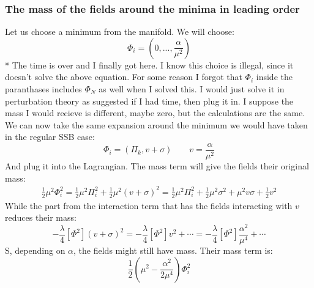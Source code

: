 \documentclass{article}
\begin{document}
\subsubsection{The mass of the fields around the minima in leading order}
Let us choose a minimum from the manifold. We will choose:
\begin{equation}
    \Phi_i = \left(0, ..., \frac{\alpha}{\mu^2}\right)
\end{equation}
* The time is over and I finally got here. I know this choice is illegal, since it doesn't solve the above equation. For some reason I forgot that $\Phi_i$ inside the paranthases includes $\Phi_N$ as well when I solved this. I would just solve it in perturbation theory as suggested if I had time, then plug it in. I suppose the mass I would recieve is different, maybe zero, but the calculations are the same.
\newline
We can now take the same expansion around the minimum we would have taken in the regular SSB case:
\begin{equation}
    \Phi_i = (\Pi_k, v + \sigma)
    \qquad
    v = \frac{\alpha}{\mu^2}
\end{equation}
And plug it into the Lagrangian. The mass term will give the fields their original mass:
\begin{equation}
\begin{gathered}
    \frac{1}{2}\mu^2\Phi_i^2 = \frac{1}{2}\mu^2\Pi_i^2 + \frac{1}{2}\mu^2\left(v + \sigma\right)^2 =
    \frac{1}{2}\mu^2\Pi_i^2 + \frac{1}{2}\mu^2\sigma^2 + \mu^2v\sigma + \frac{1}{2}v^2
\end{gathered}
\end{equation}
While the part from the interaction term that has the fields interacting with $v$ reduces their mass:
\begin{equation}
    -\frac{\lambda}{4} \left[\Phi^2\right](v + \sigma)^2 = 
    -\frac{\lambda}{4} \left[\Phi^2\right]v^2 + \cdots = 
    -\frac{\lambda}{4} \left[\Phi^2\right]\frac{\alpha^2}{\mu^4} + \cdots
\end{equation}
S, depending on $\alpha$, the fields might still have mass. Their mass term is:
\begin{equation}
    \frac{1}{2}\left(\mu^2 - \frac{\alpha^2}{2\mu^4}\right)\Phi_i^2
\end{equation}
\end{document}
